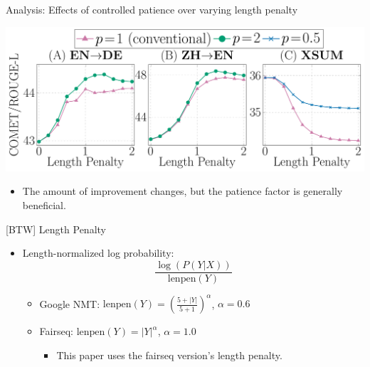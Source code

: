 \documentclass[t, unicode, 12pt, xdvipdfmx, aspectratio=169, bxjsarticle]{beamer}
\begin{document}
\begin{frame}[label={sec:orgeaa4f50}]{\normalsize Analysis: Effects of controlled patience over varying length penalty}
\begin{center}
\includegraphics[width=0.65\linewidth]{./figure/varying_lenpen.pdf}
\end{center}

\vspace{-0.3cm}
\begin{itemize}
\item The amount of improvement changes, but the patience factor is generally beneficial.
\end{itemize}
\end{frame}

\begin{frame}[label={sec:org7b1d9a5}]{[BTW] Length Penalty}
\begin{itemize}
\item Length-normalized log probability:
\begin{equation*}
    \frac{\log (P(Y|X))}{\mathrm{lenpen}(Y)}
\end{equation*}

\begin{itemize}
\item Google NMT: \(\mathrm{lenpen}(Y) = \left(\frac{5 + |Y|}{5 + 1}\right)^\alpha\), \(\alpha = 0.6\)
\item Fairseq: \(\mathrm{lenpen}(Y) = |Y|^\alpha\), \(\alpha = 1.0\)
\begin{itemize}
\item This paper uses the fairseq version's length penalty.
\end{itemize}
\end{itemize}
\end{itemize}
\end{frame}
\end{document}
